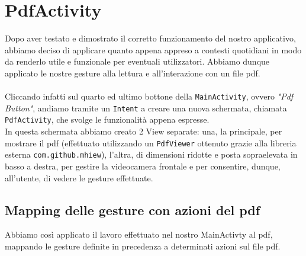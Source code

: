 \section{PdfActivity}
Dopo aver testato e dimostrato il corretto funzionamento del nostro applicativo, abbiamo deciso di applicare 
quanto appena appreso a contesti quotidiani in modo da renderlo utile e funzionale per eventuali 
utilizzatori. Abbiamo dunque applicato le nostre gesture alla lettura e all'interazione con un file pdf.\\
\\
\noindent Cliccando infatti sul quarto ed ultimo bottone della \texttt{MainActivity}, ovvero \textit{"Pdf Button"}, andiamo 
tramite un \texttt{Intent} a creare una nuova schermata, chiamata \texttt{PdfActivity}, che svolge le funzionalità 
appena espresse.\\
In questa schermata abbiamo creato 2 View separate: una, la principale, per 
mostrare il pdf (effettuato utilizzando un \texttt{PdfViewer} ottenuto grazie alla libreria esterna 
\texttt{com.github.mhiew}), l'altra, di dimensioni ridotte e posta sopraelevata in basso a destra, per 
gestire la videocamera frontale e per consentire, dunque, all'utente, di vedere le gesture 
effettuate.
\begin{figure}[H]
    \centering
\end{figure}

\subsection{Mapping delle gesture con azioni del pdf}
Abbiamo così applicato il lavoro effettuato nel nostro MainActivty al pdf, mappando le gesture definite in precedenza a determinati azioni sul file pdf.


